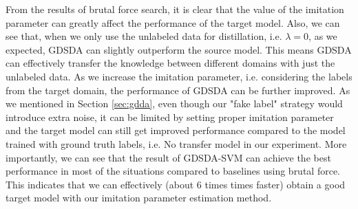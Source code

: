 From the results of brutal force search, it is clear that the value of the imitation parameter can greatly affect the performance of the target model.
Also, we can see that, when we only use the unlabeled data for distillation, i.e. $\lambda = 0$, as we expected, GDSDA can slightly outperform the source model. This means GDSDA can effectively transfer the knowledge between different domains with just the unlabeled data. As we increase the imitation parameter, i.e. considering the labels from the target domain, the performance of GDSDA can be further improved. As we mentioned in Section \ref{sec:gdda}, even though our "fake label" strategy would introduce extra noise, it can be limited by setting proper imitation parameter and the target model can still get improved performance compared to the model trained with ground truth labels, i.e. No transfer model in our experiment.
More importantly, we can see that the result of GDSDA-SVM can achieve the best performance in most of the situations compared to baselines using brutal force. This indicates that we can effectively (about 6 times times faster) obtain a good target model with our imitation parameter estimation method.
